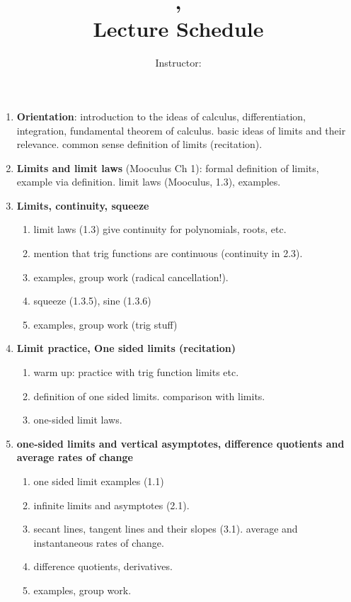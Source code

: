 \documentclass[12pt]{amsart}
\title{\course, \semester \\ Lecture Schedule}
\author{Instructor: \instructor}
\begin{document}
\maketitle

\begin{enumerate}[1. ]

\item \textbf{Orientation}: introduction to the ideas of calculus, differentiation,
integration, fundamental theorem of calculus. basic ideas of limits and
their relevance. common sense definition of limits (recitation).
\item \textbf{Limits and limit laws} (Mooculus Ch 1): formal definition of
limits, example via definition. limit laws (Mooculus, 1.3), examples.
\item \textbf{Limits, continuity, squeeze}
\begin{enumerate}[ \ \  i. ]
\item
limit laws (1.3) give continuity for polynomials, roots, etc. 
\item
mention that trig functions are continuous (continuity in 2.3).
\item
examples, group work (radical cancellation!).
\item
squeeze (1.3.5), sine (1.3.6)
\item
examples, group work (trig stuff)
\end{enumerate}
\item \textbf{Limit practice, One sided limits (recitation)}\begin{enumerate}[ \ \  i. ]
\item
warm up: practice with trig function limits etc.
\item
definition of one sided limits. comparison with limits.
\item
one-sided limit laws. 
\end{enumerate}

\item \textbf{one-sided limits and vertical asymptotes, difference
quotients and average rates of change}
\begin{enumerate}[ \ \  i. ]
\item
one sided limit examples (1.1)
\item
infinite limits and asymptotes (2.1).
\item
secant lines, tangent lines and their slopes (3.1). average and instantaneous
rates of change.
\item
difference quotients, derivatives.
\item
examples, group work.
\end{enumerate}

\end{enumerate}
\end{document}
